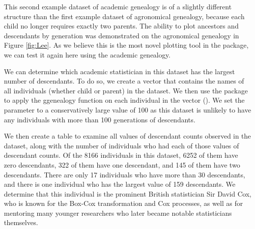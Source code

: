 \documentclass[article,shortnames]{jss}
\begin{document}

This second example dataset of academic genealogy is of a slightly different structure than the first example dataset of agronomical genealogy, because each child no longer requires exactly two parents. The ability to plot ancestors and descendants by generation was demonstrated on the agronomical genealogy in Figure \ref{fig:Lee}. As we believe this is the most novel plotting tool in the  package, we can test it again here using the academic genealogy.

We can determine which academic statistician in this  dataset has the largest number of descendants. To do so, we create a vector  that contains the names of all individuals (whether child or parent) in the dataset. We then use the  package to apply the ggenealogy function  on each individual in the  vector (\citealt{dplyr}). We set the parameter  to a conservatively large value of 100 as this dataset is unlikely to have any individuals with more than 100 generations of descendants.

We then create a table to examine all values of descendant counts observed in the dataset, along with the number of individuals who had each of those values of descendant counts. Of the 8166 individuals in this dataset, 6252 of them have zero descendants, 322 of them have one descendant, and 145 of them have two descendants. There are only 17 individuals who have more than 30 descendants, and there is one individual who has the largest value of 159 descendants. We determine that this individual is the prominent British statistician Sir David Cox, who is known for the Box-Cox transformation and Cox processes, as well as for mentoring many younger researchers who later became notable statisticians themselves.
\end{document}

